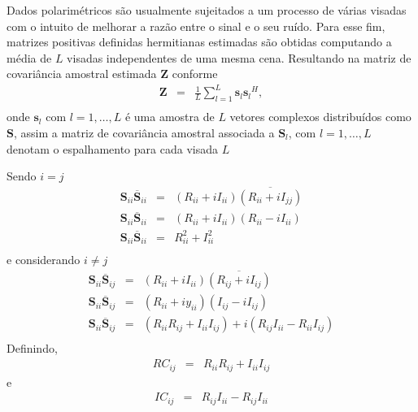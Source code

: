 \documentclass[conference]{IEEEtran}
\begin{document}
Dados polarimétricos são usualmente sujeitados a um processo de várias visadas com o intuito de melhorar a razão entre o sinal e o seu ruído. Para esse fim, matrizes positivas definidas hermitianas estimadas são obtidas computando a média de $L$ visadas independentes de uma mesma cena. Resultando na matriz de covariância amostral estimada {\bf Z} conforme \cite{good, ade}
\begin{equation}
\begin{array}{ccc}
    \mathbf{Z}&=&\frac{1}{L}\displaystyle{\sum_{l=1}^{L} {\mathbf{s}_l}{\mathbf{s}_l}^H}, \\
\end{array}
\end{equation}
onde $\mathbf{s}_l$ com $l = 1, \dots, L$ é uma amostra de $\mathit{L}$ vetores complexos distribuídos como $\mathbf{S}$, assim a matriz de covariância amostral associada a $\mathbf{S}_l$, com $l=1,\dots,L$ denotam o espalhamento para cada visada $L$

Sendo $i=j$
\begin{equation}
\begin{array}{ccc}
\mathbf{S}_{ii}\overline{\mathbf{S}}_{ii}&=& (R_{ii}+iI_{ii})\overline{(R_{ii}+iI_{jj})} \\
\mathbf{S}_{ii}\overline{\mathbf{S}}_{ii}&=& (R_{ii}+iI_{ii})(R_{ii}-iI_{ii}) \\
\mathbf{S}_{ii}\overline{\mathbf{S}}_{ii}&=& R_{ii}^2+I_{ii}^2 \\
\end{array}
\end{equation}
e considerando $i \neq j$
\begin{equation}
\begin{array}{ccc}
\mathbf{S}_{ii}\overline{\mathbf{S}}_{ij}&=& (R_{ii}+iI_{ii})\overline{(R_{ij}+iI_{ij})} \\
\mathbf{S}_{ii}\overline{\mathbf{S}}_{ij}&=& (R_{ii}+iy_{ii})(I_{ij}-iI_{ij}) \\
\mathbf{S}_{ii}\overline{\mathbf{S}}_{ij}&=& (R_{ii}R_{ij}+I_{ii}I_{ij})+i(R_{ij}I_{ii}-R_{ii}I_{ij}) \\
\end{array}
\end{equation}
 Definindo,
 \begin{equation}
\begin{array}{ccc}
	  RC_{ij}&=&  R_{ii}R_{ij}+I_{ii}I_{ij} 
\end{array}
\end{equation}
e
\begin{equation}
\begin{array}{ccc}
	  IC_{ij}&=& R_{ij}I_{ii}-R_{ij}I_{ii}
\end{array}
\end{equation}
\end{document}
